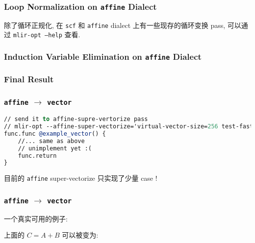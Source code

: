 \documentclass[aspectratio=169]{ctexbeamer}
\begin{document}
\begin{frame}[fragile]
    \frametitle{Loop Normalization on \texttt{affine} Dialect}

    \begin{minipage}[t]{0.6\linewidth}
        
    \end{minipage}%
    \hfill%
    \begin{minipage}[t]{0.4\linewidth}
        \vspace{3em}
        除了循环正规化, 在 \texttt{scf} 和 \texttt{affine} dialect 上有一些现存的循环变换 pass, 可以通过 \texttt{mlir-opt --help} 查看.
    \end{minipage}

\end{frame}

\begin{frame}[fragile]
    \frametitle{Induction Variable Elimination on \texttt{affine} Dialect}

    
\end{frame}

\begin{frame}[fragile]
    \frametitle{Final Result}

    
\end{frame}

\begin{frame}[fragile]
    \frametitle{\texttt{affine} $\rightarrow$ \texttt{vector}}

    \begin{lstlisting}[language=llvm]
// send it to affine-supre-vertorize pass
// mlir-opt --affine-super-vectorize='virtual-vector-size=256 test-fastest-varying=0'
func.func @example_vector() {
    //... same as above
    // unimplement yet :(
    func.return
}
    \end{lstlisting}

    目前的 \texttt{affine} super-vectorize 只实现了少量 case !

\end{frame}

\begin{frame}[fragile]
    \frametitle{\texttt{affine} $\rightarrow$ \texttt{vector}}

    一个真实可用的例子:

    

    上面的 $C = A + B$ 可以被变为:

    

\end{frame}
\end{document}
